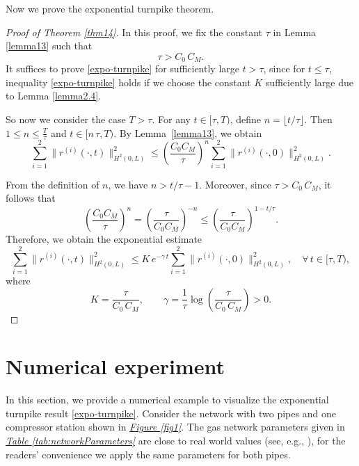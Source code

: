 \documentclass[12pt]{article}
\numberwithin{equation}{section}
\begin{document}
Now we prove the exponential turnpike theorem.  
\begin{proof}[Proof of Theorem \ref{thm14}]
In this proof, we fix the constant $\tau$ in Lemma \ref{lemma13} such that 
\[\tau>C_0 \, C_M.\] 
It suffices to prove \eqref{expo-turnpike} for sufficiently large $t>\tau$, since for $t\leq \tau$,
inequality \eqref{expo-turnpike} holds if we choose the constant $K$ sufficiently large due to Lemma \ref{lemma2.4}.

    So now we consider the case $T>\tau$. 
For any $t \in [\tau, T)$, define $n = \lfloor t/\tau \rfloor$. Then $1 \leq n \leq \frac{T}{\tau}$ and $t \in [n \, \tau, T)$. By Lemma~\ref{lemma13}, we obtain
$$
\sum_{i=1}^2 \|r^{(i)}(\cdot,t)\|_{H^2(0,L)}^2 
\leq \left(\frac{C_0 C_M}{\tau}\right)^n 
\sum_{i=1}^2 \|r^{(i)}(\cdot,0)\|_{H^2(0,L)}^2.
$$

From the definition of $n$, we have $n > t/\tau - 1$. Moreover, since $\tau > C_0 \, C_M$, it follows that
$$
\left(\frac{C_0 C_M}{\tau}\right)^n 
= \left(\frac{\tau}{C_0 C_M}\right)^{-n}
\leq \left(\frac{\tau}{C_0 C_M}\right)^{1 - t/\tau}.
$$
Therefore, we obtain the exponential estimate
$$
\sum_{i=1}^2 \|r^{(i)}(\cdot,t)\|_{H^2(0,L)}^2 
\leq K \,  e^{-\gamma \, t} 
\sum_{i=1}^2 \|r^{(i)}(\cdot,0)\|_{H^2(0,L)}^2,
\quad \forall\, t \in [\tau, T),
$$
where
$$
K = \frac{\tau}{C_0 \,  C_M}, 
\qquad 
\gamma = \frac{1}{\tau} \log\!\left(\frac{\tau}{C_0 \,  C_M}\right) > 0.
$$
\end{proof}
 



\section{Numerical experiment}\label{section:5}

In this section, we provide a numerical example to visualize the exponential turnpike result \eqref{expo-turnpike}. Consider the network with two pipes and one compressor station shown in \hyperref[fig1]{\textit{Figure \ref*{fig1}}}. The gas network parameters given in \hyperref[tab:networkParameters]{\textit{Table \ref*{tab:networkParameters}}} are close to real world values (see, e.g., \cite{GugatSchuster2018, GugatEtAl2024, SchusterEtAl2026}), for the readers' convenience we apply the same parameters for both pipes.
\end{document}
